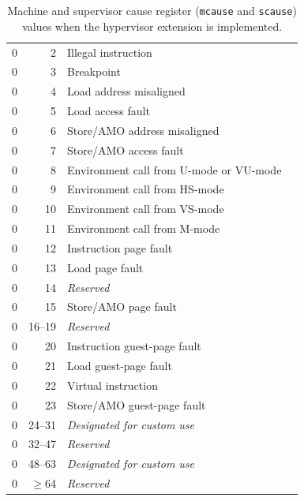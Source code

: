 \begin{table}[p]
\begin{center}
\begin{tabular}{|r|r|l|l|}
  0         & 2               & Illegal instruction \\
  0         & 3               & Breakpoint \\
  0         & 4               & Load address misaligned \\
  0         & 5               & Load access fault \\
  0         & 6               & Store/AMO address misaligned \\
  0         & 7               & Store/AMO access fault \\
  0         & 8               & Environment call from U-mode or VU-mode \\
  0         & 9               & Environment call from HS-mode \\
  0         & 10              & Environment call from VS-mode \\
  0         & 11              & Environment call from M-mode \\
  0         & 12              & Instruction page fault \\
  0         & 13              & Load page fault \\
  0         & 14              & {\em Reserved} \\
  0         & 15              & Store/AMO page fault \\
  0         & 16--19          & {\em Reserved} \\
  0         & 20              & Instruction guest-page fault \\
  0         & 21              & Load guest-page fault \\
  0         & 22              & Virtual instruction \\
  0         & 23              & Store/AMO guest-page fault \\
  0         & 24--31          & {\em Designated for custom use} \\
  0         & 32--47          & {\em Reserved} \\
  0         & 48--63          & {\em Designated for custom use} \\
  0         & $\ge$64         & {\em Reserved} \\
  \hline
\end{tabular}
\end{center}
\caption{Machine and supervisor cause register ({\tt mcause} and
{\tt scause}) values when the hypervisor extension is implemented.}
\label{hcauses}
\end{table}

